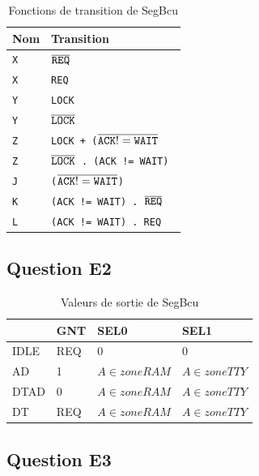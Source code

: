 \documentclass{article}
\begin{document}
\begin{table}[H]
\centering
\begingroup
\setlength{\tabcolsep}{5pt}
\renewcommand{\arraystretch}{1.1}
\begin{tabular}{ | l | l | }
\hline
Nom    &   Transition  \\
\hline
\tt{X}      & \tt{$\overline{\tt{REQ}}$} \\
\tt{X}      & \tt{REQ} \\

\tt{Y}      & \tt{LOCK} \\
\tt{Y}      & \tt{$\overline{\tt{LOCK}}$} \\

\tt{Z}      & \tt{LOCK + ($\overline{\tt{ACK != WAIT}}$} \\
\tt{Z}      & \tt{$\overline{\tt{LOCK}}$ . (ACK != WAIT)} \\

\tt{J}      & \tt{($\overline{\tt{ACK != WAIT}}$)} \\
\tt{K}      & \tt{(ACK != WAIT) . $\overline{\tt{REQ}}$} \\
\tt{L}      & \tt{(ACK != WAIT) . REQ} \\
\hline
\end{tabular}
\endgroup
\caption{Fonctions de transition de SegBcu}
\end{table}

\subsection{Question E2}

\begin{table}[H]
\centering
\begingroup
\setlength{\tabcolsep}{5pt}
\renewcommand{\arraystretch}{1.1}
\begin{tabular}{|l|l|l|l|}
\hline
        & GNT   & SEL0               & SEL1            \\
\hline
IDLE    & REQ   & 0                  & 0               \\
AD      & 1     & $A \in zoneRAM$    & $A \in zoneTTY$ \\
DTAD    & 0     & $A \in zoneRAM$    & $A \in zoneTTY$ \\
DT      & REQ   & $A \in zoneRAM$    & $A \in zoneTTY$ \\
\hline
\end{tabular}
\endgroup
\caption{Valeurs de sortie de SegBcu}
\end{table}

\subsection{Question E3}
\end{document}
